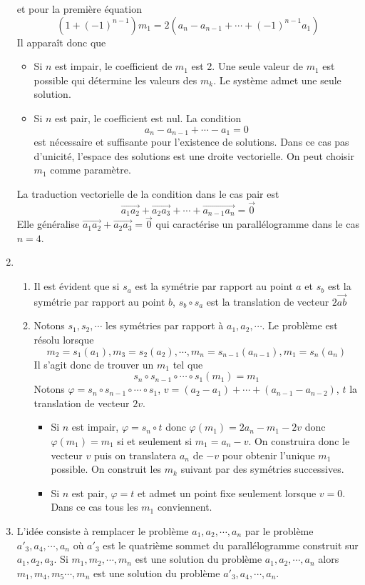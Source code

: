 \begin{enumerate}
et pour la première équation
\[(1+(-1)^{n-1})m_{1}=2(a_{n}-a_{n-1}+\cdots +(-1)^{n-1}a_{1})\]
Il apparaît donc que
\begin{itemize}
\item Si $n$ est impair, le coefficient de $m_{1}$ est 2. Une seule valeur de $m_{1}$ est possible qui détermine les valeurs des $m_{k}$. Le système admet une seule solution.
\item Si $n$ est pair, le coefficient est nul. La condition
\[a_{n}-a_{n-1}+\cdots-a_{1}=0\]
est nécessaire et suffisante pour l'existence de solutions. Dans ce cas pas d'unicité, l'espace des solutions est une droite vectorielle. On peut choisir $m_{1}$ comme paramètre.
\end{itemize}
La traduction vectorielle de la condition dans le cas pair est 
\[\overrightarrow{a_{1}a_{2}}+\overrightarrow{a_{2}a_{3}}+\cdots+\overrightarrow{a_{n-1}a_{n}}=\overrightarrow{0}\]
Elle généralise $\overrightarrow{a_{1}a_{2}}+\overrightarrow{a_{2}a_{3}}=\overrightarrow{0}$ qui caractérise un parallélogramme dans le cas $n=4$.
\item \begin{enumerate}
\item Il est évident que si $s_{a}$ est la symétrie par rapport au point $a$ et $s_{b}$ est la symétrie par rapport au point $b$, $s_{b}\circ s_{a}$ est la translation de vecteur $2\overrightarrow{ab}$
\item Notons $s_{1},s_{2},\cdots$ les symétries par rapport à $a_{1},a_{2},\cdots$. Le problème est résolu lorsque
\[m_{2}=s_{1}(a_{1}), m_{3}=s_{2}(a_{2}),\cdots, m_{n}=s_{n-1}(a_{n-1}), m_{1}=s_{n}(a_{n})\]
Il s'agit donc de trouver un $m_{1}$ tel que
\[s_{n}\circ s_{n-1}\circ \cdots \circ s_{1}(m_{1})=m_{1}\]
Notons $\varphi= s_{n}\circ s_{n-1}\circ \cdots \circ s_{1}$, $v=(a_{2}-a_{1})+\cdots+(a_{n-1}-a_{n-2})$, $t$ la translation de vecteur $2v$.
\begin{itemize}
\item Si $n$ est impair, $\varphi=s_{n}\circ t$ donc $\varphi (m_{1})=2a_{n}-m_{1}-2v$ donc $\varphi (m_{1})=m_{1}$ si et seulement si $m_{1}=a_{n}-v$. On construira donc le vecteur $v$ puis on translatera $a_{n}$ de $-v$ pour obtenir l'unique $m_{1}$ possible. On construit les $m_{k}$ suivant par des symétries successives.
\item Si $n$ est pair, $\varphi = t$ et admet un point fixe seulement lorsque $v=0$. Dans ce cas tous les $m_{1}$ conviennent.
\end{itemize}
\end{enumerate}
\item L'idée consiste à remplacer le problème $a_{1},a_{2},\cdots,a_{n}$ par le problème $ a'_{3},a_{4},\cdots,a_{n}$ où $a'_{3}$ est le quatrième sommet du parallélogramme construit sur $a_{1},a_{2},a_{3}$. Si $ m_{1},m_{2},\cdots,m_{n}$ est une solution du problème $a_{1},a_{2},\cdots,a_{n}$ alors $m_{1},m_{4},m_{5}\cdots,m_{n}$ est une solution du problème $a'_{3},a_{4},\cdots,a_{n}$.
\end{enumerate}
%
